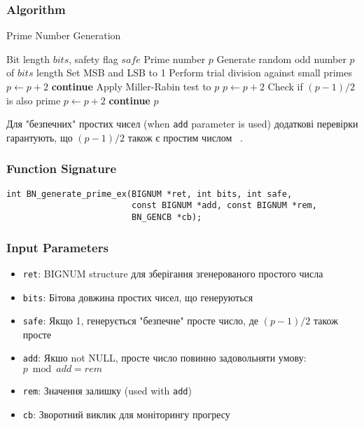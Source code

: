 \subsubsection{Algorithm}
\begin{algorithm}
    \caption{Prime Number Generation}
    \begin{algorithmic}[1]
        \Require Bit length $bits$, safety flag $safe$
        \Ensure Prime number $p$
        \State Generate random odd number $p$ of $bits$ length
        \State Set MSB and LSB to 1
        \Repeat
        \State Perform trial division against small primes
        \State $p \gets p + 2$
        \State \textbf{continue}
        \EndIf
        \State Apply Miller-Rabin test to $p$
        \State $p \gets p + 2$
        \Else
        \State Check if $(p-1)/2$ is also prime
        \State $p \gets p + 2$
        \State \textbf{continue}
        \EndIf
        \EndIf
        \State \Return $p$
        \EndIf
    \end{algorithmic}
\end{algorithm}

Для "безпечних"{} простих чисел (when \texttt{add} parameter is used) додаткові перевірки гарантують, що $(p-1)/2$ 
також є простим числом ~\cite{schneier2015applied}.

\subsubsection{Function Signature}
\begin{verbatim}
int BN_generate_prime_ex(BIGNUM *ret, int bits, int safe,
                         const BIGNUM *add, const BIGNUM *rem,
                         BN_GENCB *cb);
\end{verbatim}

\subsubsection{Input Parameters}
\begin{itemize}
    \item \texttt{ret}: BIGNUM structure для зберігання згенерованого простого числа
    \item \texttt{bits}: Бітова довжина простих чисел, що генеруються
    \item \texttt{safe}: Якщо 1, генерується "безпечне"{} просте число, де $(p-1)/2$ також просте
    \item \texttt{add}: Якшо not NULL, просте число повинно задовольняти умову: $p \bmod add = rem$
    \item \texttt{rem}: Значення залишку (used with \texttt{add})
    \item \texttt{cb}: Зворотний виклик для моніторингу прогресу
\end{itemize}

